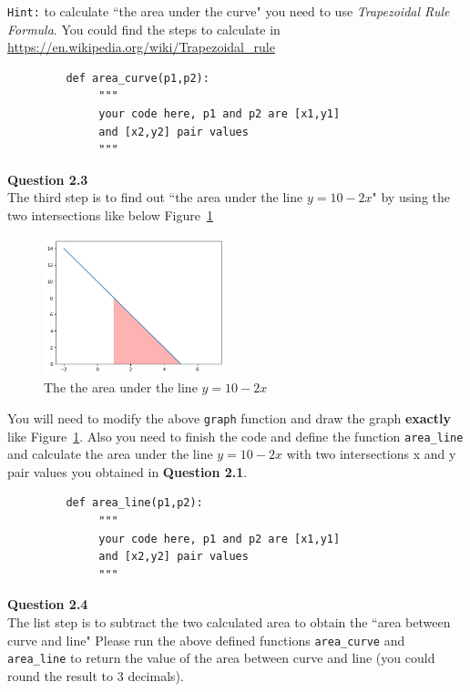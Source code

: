 \documentclass[a4paper]{article}
\begin{document}
\begin{answer}
     \texttt{Hint:} to calculate ``the area under the curve" you need to use \emph{Trapezoidal Rule Formula}. You could find the steps to calculate in \url{https://en.wikipedia.org/wiki/Trapezoidal_rule} \\

     \begin{lstlisting}
         def area_curve(p1,p2):
              """
              your code here, p1 and p2 are [x1,y1] 
              and [x2,y2] pair values
              """
     \end{lstlisting}

     \textbf{Question 2.3} \\
     The third step is to find out ``the area under the line $y=10-2x$" by using the two intersections like below Figure~\ref{fig:2.3q}
    \begin{figure}[H]
        \centering
        \includegraphics[height=4cm,keepaspectratio]{figure/2.3q.png}
        \caption{The the area under the line $y=10-2x$}
        \label{fig:2.3q}
    \end{figure}

    You will need to modify the above \texttt{graph} function and draw the graph \textbf{exactly} like Figure~\ref{fig:2.3q}.
     Also you need to finish the code and define the function \texttt{area_line} and calculate
     the area under the line $y=10-2x$ with two intersections x and y 
     pair values you obtained in \textbf{Question 2.1}. \\

    \begin{lstlisting}
         def area_line(p1,p2):
              """
              your code here, p1 and p2 are [x1,y1] 
              and [x2,y2] pair values
              """
     \end{lstlisting}

     \textbf{Question 2.4} \\
     The list step is to subtract the two calculated area to obtain the ``area between curve and line" Please run the above defined functions \texttt{area_curve} and \texttt{area_line} to return the value of the area between curve and line (you could round the result to 3 decimals).
    
    \end{answer}
\end{document}
